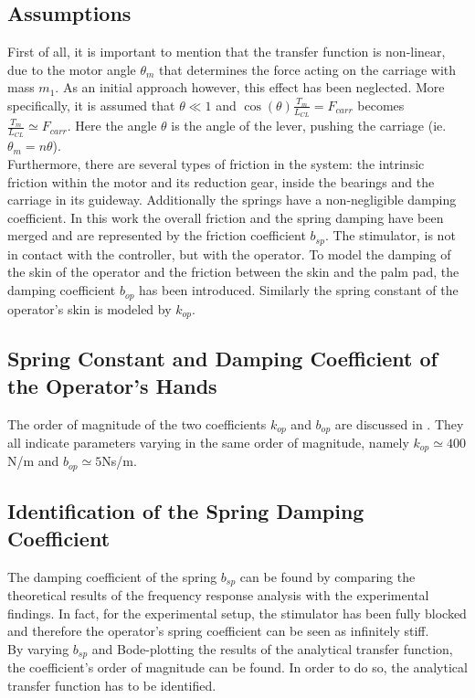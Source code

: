 	\subsection{Assumptions}
	First of all, it is important to mention that the transfer function is non-linear, due to the motor angle $\theta_m$ that determines the force acting on the carriage with mass $m_1$. As an initial approach however, this effect has been neglected. More specifically, it is assumed that $\theta \ll 1$ and $\cos{(\theta)} \frac{T_m}{L_{CL} } = F_{carr} $ becomes $\frac{T_m}{L_{CL} } \simeq F_{carr} $. Here the angle $\theta$ is the angle of the lever, pushing the carriage (ie. $\theta_m = n \theta$). \\
	Furthermore, there are several types of friction in the system: the intrinsic friction within the motor and its reduction gear, inside the bearings and the carriage in its guideway. Additionally the springs have a non-negligible damping coefficient. In this work the overall friction and the spring damping have been merged and are represented by the friction coefficient $b_{sp}$. The stimulator, is not in contact with the controller, but with the operator. To model the damping of the skin of the operator and the friction between the skin and the palm pad, the damping coefficient $b_{op}$ has been introduced. Similarly the spring constant of the operator's skin is modeled by $k_{op}$.\\
	
	\subsection{Spring Constant and Damping Coefficient of the Operator's Hands}
	The order of magnitude of the two coefficients $k_{op}$ and $b_{op}$ are discussed in \cite{Kuchenbecker2003} \cite{Park2014} \cite{Speich2005}. They all indicate parameters varying in the same order of magnitude, namely $k_{op} \simeq 400$N/m and $b_{op} \simeq 5$Ns/m.\\
	
	\subsection{Identification of the Spring Damping Coefficient}
	The damping coefficient of the spring $b_{sp}$ can be found by comparing the theoretical results of the frequency response analysis with the experimental findings. In fact, for the experimental setup, the stimulator has been fully blocked and therefore the operator's spring coefficient can be seen as infinitely stiff.\\
	By varying $b_{sp}$ and Bode-plotting the results of the analytical transfer function, the coefficient's order of magnitude can be found. In order to do so, the analytical transfer function has to be identified.
	
